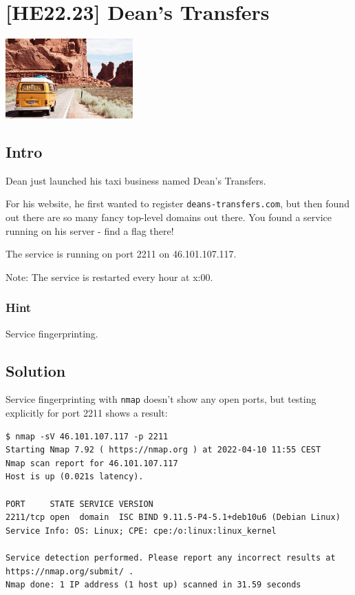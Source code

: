 
\hypertarget{he22.23}{%
\chapter{[HE22.23] Dean's Transfers}\label{he22.23}}

\begin{marginfigure}
	\includegraphics[width=49mm]{level6/challenge23.jpg}
\end{marginfigure}
\section{Intro}
Dean just launched his taxi business named Dean's Transfers.

\noindent
For his website, he first wanted to register \texttt{deans-transfers.com}, 
but then found out there are so many fancy top-level domains out there. 
You found a service running on his server - find a flag there!

\noindent
The service is running on port 2211 on 46.101.107.117.

\noindent
Note: The service is restarted every hour at x:00.

\subsection{Hint}
Service fingerprinting.

\section{Solution}\label{hv22.23solution}

Service fingerprinting with \verb+nmap+ doesn't show any open ports, but
testing explicitly for port 2211 shows a result:

\begin{fullwidth}
{\footnotesize
\begin{verbatim}
$ nmap -sV 46.101.107.117 -p 2211
Starting Nmap 7.92 ( https://nmap.org ) at 2022-04-10 11:55 CEST
Nmap scan report for 46.101.107.117
Host is up (0.021s latency).

PORT     STATE SERVICE VERSION
2211/tcp open  domain  ISC BIND 9.11.5-P4-5.1+deb10u6 (Debian Linux)
Service Info: OS: Linux; CPE: cpe:/o:linux:linux_kernel

Service detection performed. Please report any incorrect results at https://nmap.org/submit/ .
Nmap done: 1 IP address (1 host up) scanned in 31.59 seconds
\end{verbatim}
}
\end{fullwidth}

